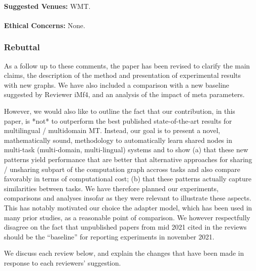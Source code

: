 \documentclass[12pt,times,a4paper,twoside]{article}
\theoremstyle{definition}
\begin{document}
\paragraph{}\textbf{Suggested Venues:} WMT.
\paragraph{}\textbf{Ethical Concerns:} None.

\subsubsection*{Rebuttal}
{
  \color{blue}
  
As a follow up to these comments, the paper has been revised to clarify the main claims, the description of the method and presentation of experimental results with new graphs. We have also included a comparison with a new baseline suggested by Reviewer iMf4, and an analysis of the impact of meta parameters.

However, we would also like to outline the fact that our contribution, in this paper, is *not* to outperform the best published state-of-the-art results for multilingual / multidomain MT. Instead, our goal is to present a novel, mathematically sound, methodology to automatically learn shared nodes in multi-task (multi-domain, multi-lingual) systems and to show (a) that these new patterns yield performance that are better that alternative approaches for sharing / unsharing subpart of the computation graph accross tasks and also compare favorably in terms of computational cost; (b) that these patterns actually capture similarities between tasks. We have therefore planned our experiments, comparisons and analyses insofar as they were relevant to illustrate these aspects. This has notably motivated our choice the adapter model, which has been used in many prior studies, as a reasonable point of comparison. We however respectfully disagree on the fact that unpublished papers from mid 2021 cited in the reviews should be the ``baseline'' for reporting experiments in november 2021.

We discuss each review below, and explain the changes that have been made in response to each reviewers' suggestion.
}

\end{document}
